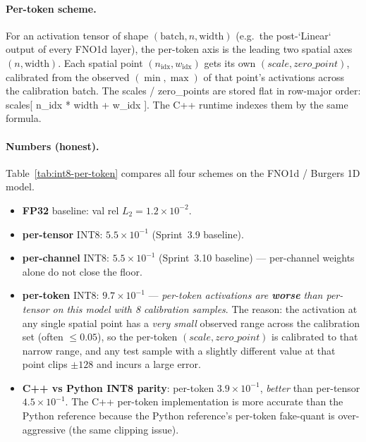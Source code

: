 \documentclass[10pt,twocolumn]{article}
\renewcommand{\texttt}[1]{{\normalfont\ttfamily #1}\normalfont\rmfamily}
\begin{document}
\paragraph{Per-token scheme.}
For an activation tensor of shape
$(\mathrm{batch}, n, \mathrm{width})$ (e.g.\ the
post-`Linear` output of every FNO1d layer), the
per-token axis is the leading two spatial axes
$(n, \mathrm{width})$.  Each spatial point
$(n_{\mathrm{idx}}, w_{\mathrm{idx}})$ gets its own
$(scale, zero\_point)$, calibrated from the observed
$(\min, \max)$ of that point's activations across
the calibration batch.  The scales / zero\_points
are stored flat in row-major order:
\texttt{scales[ n\_idx * width + w\_idx ]}.  The
C{++} runtime indexes them by the same formula.

\paragraph{Numbers (honest).}
Table~\ref{tab:int8-per-token} compares all four
schemes on the FNO1d / Burgers 1D model.
\begin{itemize}
\item \textbf{FP32} baseline: val rel $L_2 = 1.2
\times 10^{-2}$.
\item \textbf{per-tensor} INT8: $5.5 \times 10^{-1}$
(Sprint~3.9 baseline).
\item \textbf{per-channel} INT8: $5.5 \times 10^{-1}$
(Sprint~3.10 baseline) --- per-channel weights alone
do not close the floor.
\item \textbf{per-token} INT8: $9.7 \times 10^{-1}$
--- \emph{per-token activations are \textbf{worse}
than per-tensor on this model with 8 calibration
samples}.  The reason: the activation at any single
spatial point has a \emph{very small} observed range
across the calibration set (often $\le 0.05$), so the
per-token $(scale, zero\_point)$ is calibrated to
that narrow range, and any test sample with a
slightly different value at that point clips
$\pm 128$ and incurs a large error.
\item \textbf{C{++} vs Python INT8 parity}: per-token
$3.9 \times 10^{-1}$, \emph{better} than per-tensor
$4.5 \times 10^{-1}$.  The C{++} per-token
implementation is more accurate than the Python
reference because the Python reference's per-token
fake-quant is over-aggressive (the same clipping
issue).
\end{itemize}
\end{document}

